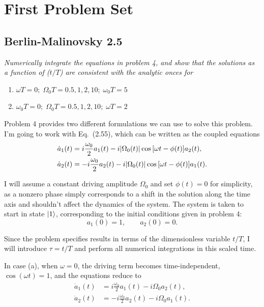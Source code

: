 \section{First Problem Set}
\subsection{Berlin-Malinovsky 2.5}
\textit{Numerically integrate the equations in problem 4, and show that the solutions as a function of ($t/T$) are consistent with the analytic onces for}
\begin{enumerate}[label=(\alph*)]

    \item $\omega T = 0; \; \Omega_0T = 0.5, 1, 2, 10; \; \omega_0T = 5$

    \item $\omega_0T = 0; \; \Omega_0T = 0.5, 1, 2, 10; \; \omega T = 2$

\end{enumerate}
\vspace{1em}

Problem 4 provides two different formulations we can use to solve this problem. I'm going to work with Eq.~(2.55), which can be written as the coupled equations
\begin{align*}
    \dot a_{1}(t) &= i \frac{\omega_{0}}{2} a_{1}(t) - i \abs{\Omega_{0}(t)} \cos{[\omega t - \phi(t)]} a_{2}(t), \\
    \dot a_{2}(t) &= -i \frac{\omega_{0}}{2} a_{2}(t) - i \abs{\Omega_{0}(t)} \cos{[\omega t - \phi(t)]} a_{1}(t).
\end{align*}

I will assume a constant driving amplitude $\Omega_{0}$ and set $\phi(t)=0$ for simplicity, as a nonzero phase simply corresponds to a shift in the solution along the time axis and shouldn't affect the dynamics of the system. The system is taken to start in state $\ket{1}$, corresponding to the initial conditions given in problem 4:
\begin{equation*}
    a_1(0)=1, \qquad a_2(0)=0.
\end{equation*}

Since the problem specifies results in terms of the dimensionless variable $t/T$, I will introduce $\tau=t/T$ and perform all numerical integrations in this scaled time.
\vspace{1em}

In case (a), when $\omega=0$, the driving term becomes time-independent, $\cos(\omega t)=1$, and the equations reduce to
\begin{align*}
  \dot a_{1}(t) &= i \frac{\omega_{0}}{2} a_{1}(t) - i\Omega_{0}a_{2}(t), \\
  \dot a_{2}(t) &= -i \frac{\omega_{0}}{2} a_{2}(t) - i\Omega_{0} a_{1}(t).
\end{align*}

